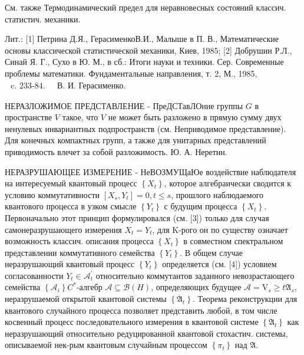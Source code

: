 \documentclass[10pt]{article}
\begin{document}
См. также Термодинамический предел для неравновесных состояний классич. статистич. механики.



Лит.: [1] Петрина Д.Я., ГерасименкоВ.И., Малыше в П. В., Математические основы классической статистической механики, Киев, 1985; [2] Добрушин Р.Л., Синай Я. Г., Сухо в Ю. М., в сб.: Итоги науки и техники. Сер. Современные проблемы математики. Фундаментальные направления, т. 2, М., 1985, $\begin{array}{ll}\text { c. 233-84. } & \text { В. И. Герасименко. }\end{array}$



НЕРАЗЛОЖИМОЕ ПРЕДСТАВЛЕНИЕ - ПреДСТавЛОние группы $G$ в пространстве $V$ такое, что $V$ не может быть разложено в прямую сумму двух ненулевых инвариантных подпространств (см. Неприводимое представление). Для конечных компактных групп, а также для унитарных представлений приводимость влечет за собой разложимость. Ю. А. Неретин.



НЕРАЗРУШАЮЩЕЕ ИЗМЕРЕНИЕ - НеВОЗМУЩаЮе воздействие наблюдателя на интересуемый квантовый процесс $\left\{X_{t}\right\}$, которое алгебраически сводится к условию коммутативности $\left[X_{s}, Y_{t}\right]=0, t \leqslant s$, прошлого наблюдаемого квантового процесса в узком смысле $\left\{Y_{t}\right\}$ с будущим процесса $\left\{X_{t}\right\}$. Первоначально этот принцип формулировался (см. [3]) только для случая самонеразрушающего измерения $X_{t}=Y_{t}$, для $\mathrm{K}$-рого он по существу означает возможность классич. описания процесса $\left\{X_{t}\right\}$ в совместном спектральном представлении коммутативного семейства $\left\{Y_{t}\right\}$. В общем случае неразрушающий квантовый процесс $\left\{Y_{t}\right\}$ определяется (см. [4]) условием согласованности $Y_{t} \in \mathscr{A}_{t}^{\prime}$ относительно коммутантов заданного невозрастающего семейства $\left\{\mathscr{A}_{i}\right\} C^{*}$-алгебр $\mathscr{A} \subseteq \mathscr{B}(H)$, определяющих будущее $\mathscr{A}=\mathrm{V}_{s} \geqslant t \mathfrak{A}_{s}$, неразрушаемой открытой квантовой системы $\left\{\mathfrak{A}_{t}\right\}$. Теорема реконструкции для квантового случайного процесса позволяет представить любой, в том числе косвенный процесс последовательного измерения в квантовой системе $\left\{\mathfrak{A}_{t}\right\}$ как неразрушающий относительно редуцированной квантовой стохастич. системы, описываемой нек-рым квантовым случайным процессом $\left\{\pi_{t}\right\}$ над $\mathfrak{A}$.
\end{document}
